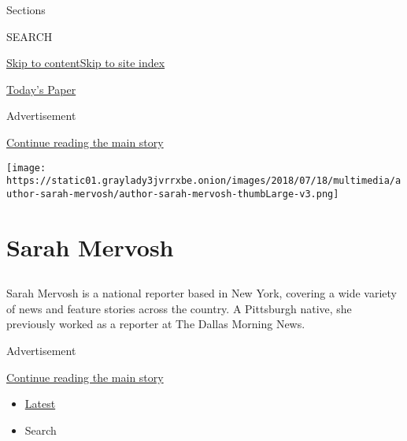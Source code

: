 Sections

SEARCH

\protect\hyperlink{site-content}{Skip to
content}\protect\hyperlink{site-index}{Skip to site index}

\href{https://myaccount.nytimes3xbfgragh.onion/auth/login?response_type=cookie\&client_id=vi}{}

\href{https://www.nytimes3xbfgragh.onion/section/todayspaper}{Today's
Paper}

Advertisement

\protect\hyperlink{after-top}{Continue reading the main story}

\texttt{[image: https://static01.graylady3jvrrxbe.onion/images/2018/07/18/multimedia/author-sarah-mervosh/author-sarah-mervosh-thumbLarge-v3.png]}

\hypertarget{sarah-mervosh}{%
\section{Sarah Mervosh}\label{sarah-mervosh}}

\subsection{}

Sarah Mervosh is a national reporter based in New York, covering a wide
variety of news and feature stories across the country. A Pittsburgh
native, she previously worked as a reporter at The Dallas Morning News.

Advertisement

\protect\hyperlink{after-mid1}{Continue reading the main story}

\begin{itemize}
\tightlist
\item
  \protect\hyperlink{stream-panel}{Latest}
\item
  Search
\end{itemize}

